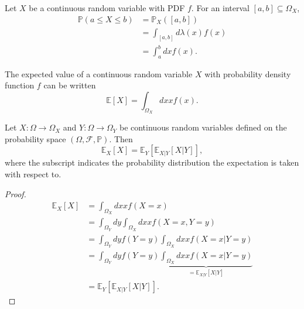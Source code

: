 \begin{example}
	Let $X$ be a continuous random variable with PDF $f$. For an interval $[a,b] \subseteq \Omega_X$,
	\begin{equation}
		\begin{split}
			\mathbb{P}(a \le X \le b) 
			&= \mathbb{P}_X([a,b])\\ 
			&= \int_{[a,b]} d\lambda(x) f(x) \\ 
			&= \int_a^b dx f(x).
		\end{split}
	\end{equation}
\end{example}

\begin{theorem}
	\label{theorem:expectaion_continuous}
	The expected value of a continuous random variable $X$ with probability density function $f$ can be written 
	\begin{equation}
		\mathbb{E}[X]=\int_{\Omega_X} dx xf(x).
	\end{equation}
\end{theorem}
\begin{theorem}
	\label{theorem:total_expectation}
	Let $X: \Omega \to \Omega_X$ and $Y: \Omega \to \Omega_Y$ be continuous random variables defined on the probability space $(\Omega, \mathcal{F}, \mathbb{P})$. Then
	\begin{equation}
		\mathbb{E}_X[X] = \mathbb{E}_Y[\mathbb{E}_{X|Y}[X| Y]],
	\end{equation}
	where the subscript indicates the probability distribution the expectation is taken with respect to.
\end{theorem}
\begin{proof}
	\begin{equation}
		\begin{split}
			\mathbb{E}_X[X] &= \int_{\Omega_X} dx x f(X=x)\\
			& = \int_{\Omega_Y} dy\int_{\Omega_X}dx x f(X=x,Y=y)\\
			& =  \int_{\Omega_Y} dy f(Y=y) \int_{\Omega_X}dx x f(X=x|Y=y)\\
			& =  \int_{\Omega_Y} dy f(Y=y) \underbrace{\int_{\Omega_X}dx x f(X=x|Y=y)}_{= \mathbb{E}_{X|Y}[X|Y]}\\
			& = \mathbb{E}_Y[\mathbb{E}_{X|Y}[X|Y]].
		\end{split}
	\end{equation}
\end{proof}

